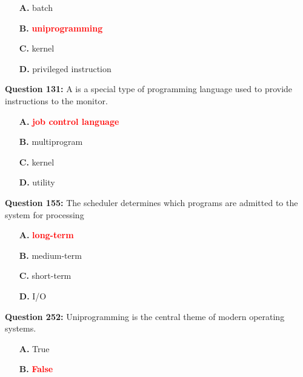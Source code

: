 \documentclass[12pt,a4paper]{article}
\begin{document}
\begin{itemize}
    \item[\textbf{A.}] batch
    \item[\textbf{B.}] \textcolor{red}{\textbf{uniprogramming}}
    \item[\textbf{C.}] kernel
    \item[\textbf{D.}] privileged instruction
\end{itemize}

\vspace{0.5cm}

\vspace{0.5cm}

\textbf{Question 131:} A \underline{\hspace{1.5cm}} is a special type of programming language used to provide instructions to the monitor.

\begin{itemize}
    \item[\textbf{A.}] \textcolor{red}{\textbf{job control language}}
    \item[\textbf{B.}] multiprogram
    \item[\textbf{C.}] kernel
    \item[\textbf{D.}] utility
\end{itemize}

\vspace{0.5cm}

\vspace{0.5cm}

\textbf{Question 155:} The \underline{\hspace{1.5cm}} scheduler determines which programs are admitted to the system for processing

\begin{itemize}
    \item[\textbf{A.}] \textcolor{red}{\textbf{long-term}}
    \item[\textbf{B.}] medium-term
    \item[\textbf{C.}] short-term
    \item[\textbf{D.}] I/O
\end{itemize}

\vspace{0.5cm}

\vspace{0.5cm}

\textbf{Question 252:} Uniprogramming is the central theme of modern operating systems.

\begin{itemize}
    \item[\textbf{A.}] True
    \item[\textbf{B.}] \textcolor{red}{\textbf{False}}
\end{itemize}
\end{document}
